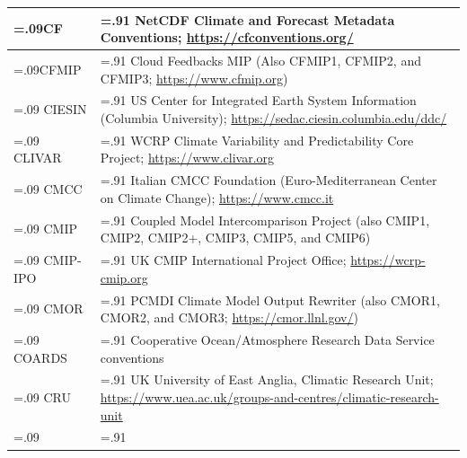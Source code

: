 \documentclass[manuscript]{copernicus}
\begin{document}
\begin{table}[htp]
{\begin{tabularx}{1\textwidth} { 
	  | >{\raggedright\arraybackslash\hsize=.09\hsize}X
	  | >{\centering\arraybackslash\hsize=.91\hsize}X | }
CF & NetCDF Climate and Forecast Metadata Conventions; \url{https://cfconventions.org/}\\ \hline
CFMIP & Cloud Feedbacks MIP (Also CFMIP1, CFMIP2, and CFMIP3; \url{https://www.cfmip.org})\\ \hline
CIESIN & US Center for Integrated Earth System Information (Columbia University); \url{https://sedac.ciesin.columbia.edu/ddc/}\\ \hline
CLIVAR & WCRP Climate Variability and Predictability Core Project; \url{https://www.clivar.org}\\ \hline
CMCC & Italian CMCC Foundation (Euro-Mediterranean Center on Climate Change); \url{https://www.cmcc.it}\\ \hline
CMIP & Coupled Model Intercomparison Project (also CMIP1, CMIP2, CMIP2+, CMIP3, CMIP5, and CMIP6)\\ \hline
CMIP-IPO & UK CMIP International Project Office; \url{https://wcrp-cmip.org}\\ \hline
CMOR & PCMDI Climate Model Output Rewriter (also CMOR1, CMOR2, and CMOR3; \url{https://cmor.llnl.gov/})\\ \hline
COARDS & Cooperative Ocean/Atmosphere Research Data Service conventions\\ \hline
CRU & UK University of East Anglia, Climatic Research Unit; \url{https://www.uea.ac.uk/groups-and-centres/climatic-research-unit}\\ \hline
\multicolumn{2}{l}{\textbf{\autoref{tab:tabAppE1-Acronyms} continued overpage..}}\\
\end{tabularx}
} %
\label{tab:tabAppE1-Acronyms}
\end{table}
\end{document}
